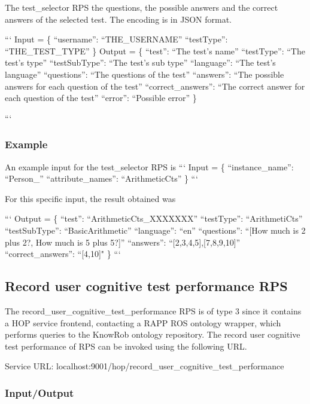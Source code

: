 The test\-\_\-selector R\-P\-S the questions, the possible answers and the correct answers of the selected test. The encoding is in J\-S\-O\-N format.

``` Input = \{ “username”\-: “\-T\-H\-E\-\_\-\-U\-S\-E\-R\-N\-A\-M\-E” “test\-Type”\-: “\-T\-H\-E\-\_\-\-T\-E\-S\-T\-\_\-\-T\-Y\-P\-E” \} {\ttfamily  } Output = \{ “test”\-: “\-The test’s name” “test\-Type”\-: “\-The test’s type” “test\-Sub\-Type”\-: “\-The test’s sub type” “language”\-: “\-The test’s language” “questions”\-: “\-The questions of the test” “answers”\-: “\-The possible answers for each question of the test” “correct\-\_\-answers”\-: “\-The correct answer for each question of the test” “error”\-: “\-Possible error” \}

``` \subsubsection*{Example}

An example input for the test\-\_\-selector R\-P\-S is ``` Input = \{ “instance\-\_\-name”\-: “\-Person\-\_” “attribute\-\_\-names”\-: “\-Arithmetic\-Cts” \} ```

For this specific input, the result obtained was

``` Output = \{ “test”\-: “\-Arithmetic\-Cts\-\_\-\-X\-X\-X\-X\-X\-X\-X” “test\-Type”\-: “\-Arithmeti\-Cts” “test\-Sub\-Type”\-: “\-Basic\-Arithmetic” “language”\-: “en” “questions”\-: “\mbox{[}How much is 2 plus 2?, How much is 5 plus 5?\mbox{]}” “answers”\-: “\mbox{[}2,3,4,5\mbox{]},\mbox{[}7,8,9,10\mbox{]}” “correct\-\_\-answers”\-: “\mbox{[}4,10\mbox{]}" \} ```

\subsection*{Record user cognitive test performance R\-P\-S}

The record\-\_\-user\-\_\-cognitive\-\_\-test\-\_\-performance R\-P\-S is of type 3 since it contains a H\-O\-P service frontend, contacting a R\-A\-P\-P R\-O\-S ontology wrapper, which performs queries to the Know\-Rob ontology repository. The record user cognitive test performance of R\-P\-S can be invoked using the following U\-R\-L.

Service U\-R\-L\-: {\ttfamily localhost\-:9001/hop/record\-\_\-user\-\_\-cognitive\-\_\-test\-\_\-performance}

\subsubsection*{Input/\-Output}

